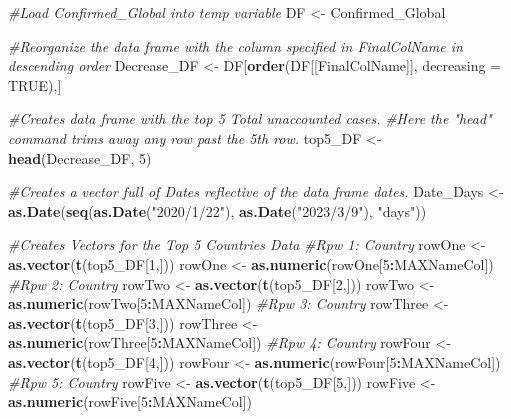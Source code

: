 \documentclass[
]{article}
\newenvironment{Shaded}{\begin{snugshade}}{\end{snugshade}}
\newcommand{\AttributeTok}[1]{\textcolor[rgb]{0.13,0.29,0.53}{#1}}
\newcommand{\CommentTok}[1]{\textcolor[rgb]{0.56,0.35,0.01}{\textit{#1}}}
\newcommand{\ConstantTok}[1]{\textcolor[rgb]{0.56,0.35,0.01}{#1}}
\newcommand{\DecValTok}[1]{\textcolor[rgb]{0.00,0.00,0.81}{#1}}
\newcommand{\FunctionTok}[1]{\textcolor[rgb]{0.13,0.29,0.53}{\textbf{#1}}}
\newcommand{\NormalTok}[1]{#1}
\newcommand{\OtherTok}[1]{\textcolor[rgb]{0.56,0.35,0.01}{#1}}
\newcommand{\SpecialCharTok}[1]{\textcolor[rgb]{0.81,0.36,0.00}{\textbf{#1}}}
\newcommand{\StringTok}[1]{\textcolor[rgb]{0.31,0.60,0.02}{#1}}
\begin{document}
\begin{Shaded}
\begin{Highlighting}[]
\CommentTok{\#Load Confirmed\_Global into temp variable}
\NormalTok{DF }\OtherTok{\textless{}{-}}\NormalTok{ Confirmed\_Global}

\CommentTok{\#Reorganize the data frame with the column specified in FinalColName in descending order}
\NormalTok{Decrease\_DF }\OtherTok{\textless{}{-}}\NormalTok{ DF[}\FunctionTok{order}\NormalTok{(DF[[FinalColName]], }\AttributeTok{decreasing =} \ConstantTok{TRUE}\NormalTok{),]}


\CommentTok{\#Creates data frame with the top 5 Total unaccounted cases.}
\CommentTok{\#Here the "head" command trims away any row past the 5th row. }
\NormalTok{top5\_DF }\OtherTok{\textless{}{-}} \FunctionTok{head}\NormalTok{(Decrease\_DF, }\DecValTok{5}\NormalTok{)}

\CommentTok{\#Creates a vector full of Dates reflective of the data frame dates. }
\NormalTok{Date\_Days }\OtherTok{\textless{}{-}} \FunctionTok{as.Date}\NormalTok{(}\FunctionTok{seq}\NormalTok{(}\FunctionTok{as.Date}\NormalTok{(}\StringTok{"2020/1/22"}\NormalTok{), }\FunctionTok{as.Date}\NormalTok{(}\StringTok{"2023/3/9"}\NormalTok{), }\StringTok{"days"}\NormalTok{))}


\CommentTok{\#Creates Vectors for the Top 5 Countries Data}
\CommentTok{\#Rpw 1: Country}
\NormalTok{rowOne }\OtherTok{\textless{}{-}} \FunctionTok{as.vector}\NormalTok{(}\FunctionTok{t}\NormalTok{(top5\_DF[}\DecValTok{1}\NormalTok{,]))}
\NormalTok{rowOne }\OtherTok{\textless{}{-}} \FunctionTok{as.numeric}\NormalTok{(rowOne[}\DecValTok{5}\SpecialCharTok{:}\NormalTok{MAXNameCol])}
\CommentTok{\#Rpw 2: Country}
\NormalTok{rowTwo }\OtherTok{\textless{}{-}} \FunctionTok{as.vector}\NormalTok{(}\FunctionTok{t}\NormalTok{(top5\_DF[}\DecValTok{2}\NormalTok{,]))}
\NormalTok{rowTwo }\OtherTok{\textless{}{-}} \FunctionTok{as.numeric}\NormalTok{(rowTwo[}\DecValTok{5}\SpecialCharTok{:}\NormalTok{MAXNameCol])}
\CommentTok{\#Rpw 3: Country}
\NormalTok{rowThree }\OtherTok{\textless{}{-}} \FunctionTok{as.vector}\NormalTok{(}\FunctionTok{t}\NormalTok{(top5\_DF[}\DecValTok{3}\NormalTok{,]))}
\NormalTok{rowThree }\OtherTok{\textless{}{-}} \FunctionTok{as.numeric}\NormalTok{(rowThree[}\DecValTok{5}\SpecialCharTok{:}\NormalTok{MAXNameCol])}
\CommentTok{\#Rpw 4: Country}
\NormalTok{rowFour }\OtherTok{\textless{}{-}} \FunctionTok{as.vector}\NormalTok{(}\FunctionTok{t}\NormalTok{(top5\_DF[}\DecValTok{4}\NormalTok{,]))}
\NormalTok{rowFour }\OtherTok{\textless{}{-}} \FunctionTok{as.numeric}\NormalTok{(rowFour[}\DecValTok{5}\SpecialCharTok{:}\NormalTok{MAXNameCol])}
\CommentTok{\#Rpw 5: Country}
\NormalTok{rowFive }\OtherTok{\textless{}{-}} \FunctionTok{as.vector}\NormalTok{(}\FunctionTok{t}\NormalTok{(top5\_DF[}\DecValTok{5}\NormalTok{,]))}
\NormalTok{rowFive }\OtherTok{\textless{}{-}} \FunctionTok{as.numeric}\NormalTok{(rowFive[}\DecValTok{5}\SpecialCharTok{:}\NormalTok{MAXNameCol])}


\end{Highlighting}
\end{Shaded}
\end{document}
